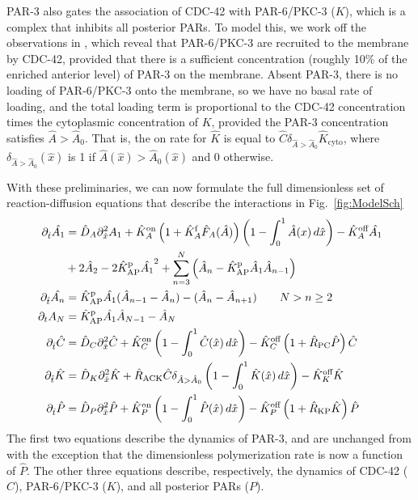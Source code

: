 \documentclass[11pt]{article}
\newcommand{\6}[1]{#1_{\text{6}}}
\newcommand{\3}[1]{#1_{\text{3}}}
\begin{document}
PAR-3 also gates the association of CDC-42 with PAR-6/PKC-3 ($K$), which is a complex that inhibits all posterior PARs. To model this, we work off the observations in \cite{sailer2015dynamic}, which reveal that PAR-6/PKC-3 are recruited to the membrane by CDC-42, provided that there is a sufficient concentration (roughly 10\% of the enriched anterior level) of PAR-3 on the membrane. Absent PAR-3, there is no loading of PAR-6/PKC-3 onto the membrane, so we have no basal rate of loading, and the total loading term is proportional to the CDC-42 concentration times the cytoplasmic concentration of $K$, provided the PAR-3 concentration satisfies $\hat A > \hat A_0$. That is, the on rate for $\hat K$ is equal to $\hat{C} \delta_{\hat A > \hat A_0}\hat K_\text{cyto}$, where $\delta_{\hat A > \hat A_0}(\hat x)$ is 1 if $\hat A(\hat x) > \hat A_0(\hat x)$ and 0 otherwise. 

With these preliminaries, we can now formulate the full dimensionless set of reaction-diffusion equations that describe the  interactions in Fig.\ \ref{fig:ModelSch}
\begin{subequations}
\label{eq:AllBC}
\begin{align}
\partial_{\hat{t}} \hat{A_1} & = \hat{D}_A \partial_{\hat{x}}^2 A_1 +\hat{K}^\text{on}_A \left(1+\hat{K}^\text{f}_A \hat F_A(\hat A) \right)\left(1 - \int_0^1 \hat A(x) \, d\hat{x} \right)- \hat{K}^\text{off}_A \hat{A_1} \\ 
 &+ 2 \hat{A}_2-2\hat{K}^\text{p}_\text{AP} \hat{A_1}^2+\sum_{n=3}^N \left(\hat A_n-\hat{K}^\text{p}_\text{AP} \hat A_1 \hat A_{n-1}\right)  \\
\partial_{\hat{t}} \hat{A_n} & =\hat{K}^\text{p}_\text{AP} \hat{A_1} (\hat A_{n-1}-\hat A_n) - (\hat A_n-\hat A_{n+1})  \qquad N > n \geq 2 \\ 
\partial_t A_N & =\hat{K}^\text{p}_\text{AP} \hat {A_1} \hat A_{N-1}- \hat A_N \\ 
\label{eq:Ceqn}
\partial_{\hat{t}} \hat{C}& =\hat{D}_C \partial_{\hat{x}}^2 \hat{C} +\hat{K}^\text{on}_C \left(1 - \int_0^1 \hat{C}(\hat x) \, d\hat{x} \right)  - \hat{K}^\text{off}_C \left(1+\hat{R}_\text{PC}\hat P\right)\hat{C}\\
\label{eq:Keqn}
\partial_{\hat{t}} \hat{K}  &= \hat{D}_K \partial_{\hat{x}}^2 \hat{K} + \hat{R}_\text{ACK} \hat{C} \delta_{\hat A > \hat A_0} \left(1 - \int_0^1 \hat{K}(\hat x) \, d\hat{x} \right)-\hat{K}^\text{off}_K \hat{K} \\
\partial_{\hat{t}} \hat{P} & =\hat{D}_P \partial_{\hat{x}}^2 \hat{P} +\hat{K}^\text{on}_P \left(1 - \int_0^1 \hat{P}(\hat x) \, d\hat{x} \right)  - \hat{K}^\text{off}_P \left(1+\hat{R}_\text{KP}\hat{K}\right)\hat{P}
\end{align}
\end{subequations}
The first two equations describe the dynamics of PAR-3, and are unchanged from \cite{lang2023oligomerization} with the exception that the dimensionless polymerization rate is now a function of $\hat P$. The other three equations describe, respectively, the dynamics of CDC-42 ($C$), PAR-6/PKC-3 ($K$), and all posterior PARs ($P$). 
\end{document}
